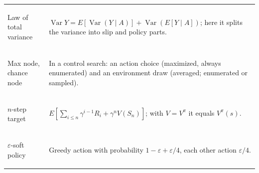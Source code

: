 \documentclass[11pt]{article}
\begin{document}
\begin{tabularx}{\linewidth}{@{}>{\bfseries\raggedright\arraybackslash}p{3.4cm}Y@{}}
Law of total variance & $\operatorname{Var}Y=E[\operatorname{Var}(Y\mid A)]+\operatorname{Var}(E[Y\mid A])$; here it splits the
  variance into slip and policy parts.\\
Max node, chance node & In a control search: an action choice (maximized, always enumerated) and an environment draw
  (averaged; enumerated or sampled).\\
$n$-step target & $E[\sum_{i\le n}\gamma^{i-1}R_i+\gamma^nV(S_n)]$; with $V=V^\pi$ it equals $V^\pi(s)$.\\
$\varepsilon$-soft policy & Greedy action with probability $1-\varepsilon+\varepsilon/4$, each other action
  $\varepsilon/4$.\\
\bottomrule
\end{tabularx}
\end{document}
